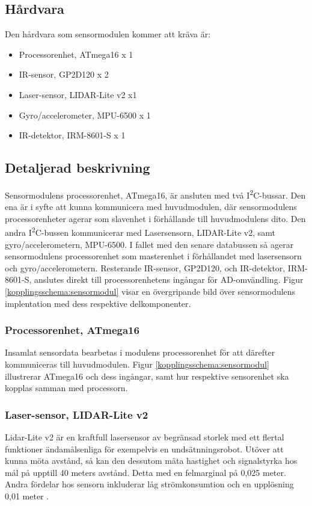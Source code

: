 \documentclass[11pt]{article}
\begin{document}
\begin{flushleft}
\subsection{Hårdvara}
Den hårdvara som sensormodulen kommer att kräva är:

\begin{itemize}
\item{Processorenhet, ATmega16 x 1}
\item{IR-sensor, GP2D120 x 2}
\item{Laser-sensor, LIDAR-Lite v2 x1}
\item{Gyro/accelerometer, MPU-6500 x 1}
\item{IR-detektor, IRM-8601-S x 1}

\end{itemize}

\subsection{Detaljerad beskrivning}

Sensormodulens processorenhet, ATmega16, är ansluten med två I\textsuperscript{2}C-bussar. Den ena är i syfte att kunna kommunicera med huvudmodulen, där sensormodulens processorenheter agerar som slavenhet i förhållande till huvudmodulens dito. Den andra I\textsuperscript{2}C-bussen kommunicerar med Lasersensorn, LIDAR-Lite v2, samt gyro/accelerometern, MPU-6500. I fallet med den senare databussen så agerar sensormodulens processorenhet som masterenhet i förhållandet med lasersensorn och gyro/accelerometern.
Resterande IR-sensor, GP2D120, och IR-detektor, IRM-8601-S, anslutes direkt till processorenhetens ingångar för AD-omvändling. Figur \ref{kopplingsschema:sensormodul} visar en övergripande bild över sensormodulens implentation med dess respektive delkomponenter. 

\subsubsection{Processorenhet, ATmega16}
Insamlat sensordata bearbetas i modulens processorenhet för att därefter kommuniceras till huvudmodulen. Figur \ref{kopplingsschema:sensormodul} illustrerar ATmega16 och dess ingångar, samt hur respektive sensorenhet ska kopplas samman med processorn. 

\subsubsection{Laser-sensor, LIDAR-Lite v2}
Lidar-Lite v2 är en kraftfull lasersensor av begränsad storlek med ett flertal funktioner ändamålsenliga för exempelvis en undsätnningsrobot. Utöver att kunna möta avstånd, så kan den dessutom mäta hastighet och signalstyrka hos mål på upptill 40 meters avstånd. Detta med en felmarginal på 0,025 meter. Andra fördelar hos sensorn inkluderar låg strömkonsumtion och en upplösning 0,01 meter \cite{7131685}.


\end{flushleft}
\end{document}
